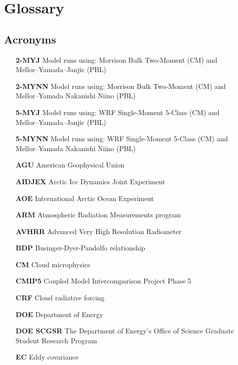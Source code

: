 \chapter{Glossary}
\section{Acronyms}
\begin{enumerate}
    \item[\textbf{2-MYJ}] Model runs using: Morrison Bulk Two-Moment (CM) and \\ 
    \hspace*{3.3cm} Mellor–Yamada–Janjic (PBL)
    \item[\textbf{2-MYNN}] Model runs using: Morrison Bulk Two-Moment (CM) and \\
    \hspace*{3.3cm} Mellor–Yamada Nakanishi Niino (PBL)
    \item[\textbf{5-MYJ}] Model runs using: WRF Single-Moment 5-Class (CM) and \\
    \hspace*{3.3cm} Mellor–Yamada–Janjic (PBL)
    \item[\textbf{5-MYNN}] Model runs using: WRF Single-Moment 5-Class (CM) and \\
    \hspace*{3.3cm} Mellor–Yamada Nakanishi Niino (PBL)
    \item[\textbf{AGU}] American Geophysical Union
    \item[\textbf{AIDJEX}] Arctic Ice Dynamics Joint Experiment
    \item[\textbf{AOE}] International Arctic Ocean Experiment
    \item[\textbf{ARM}] Atmospheric Radiation Measurements program
    \item[\textbf{AVHRR}] Advanced Very High Resolution Radiometer 
    \item[\textbf{BDP}] Businger-Dyer-Pandolfo relationship
    \item[\textbf{CM}] Cloud microphysics
    \item[\textbf{CMIP5}] Coupled Model Intercomparison Project Phase 5
    \item[\textbf{CRF}] Cloud radiative forcing
    \item[\textbf{DOE}] Department of Energy
    \item[\textbf{DOE SCGSR}] The Department of Energy's Office of Science Graduate Student Research Program
    \item[\textbf{EC}] Eddy covariance 

\end{enumerate}
